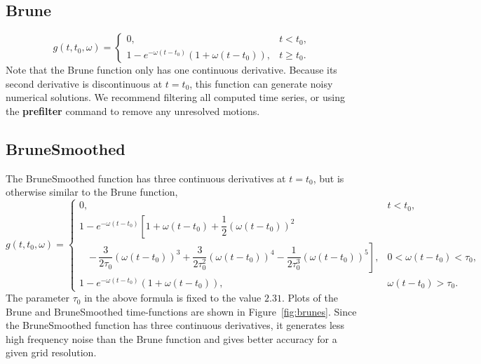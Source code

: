 \documentclass[11pt]{report}
\begin{document}
\subsection{Brune} 
 \label{brune}
\[
 g(t,t_0,\omega) = \left\{
\begin{array}{ll} 
0, & t < t_0, \\ 
1 - e^{-\omega(t-t_0)}( 1+\omega(t-t_0) ), & t \geq t_0.
\end{array}
\right.
\]
Note that the Brune function only has one continuous derivative. Because its second derivative is discontinuous at
$t=t_0$, this function can generate noisy numerical solutions. We recommend filtering all computed time
series, or using the {\bf prefilter} command to remove any unresolved motions.

\subsection{BruneSmoothed}
The BruneSmoothed function has three continuous derivatives at $t=t_0$, but is otherwise similar to
the Brune function,
\[
 g(t,t_0,\omega) = \left\{
\begin{array}{ll} 
0, & t < t_0, \\ 
1 - e^{-\omega(t-t_0)}\left[ 1+\omega(t-t_0) + \dfrac{1}{2}(\omega(t-t_0))^2\right. & \\
\quad \left.-\,\dfrac{3}{2\tau_0}( \omega(t-t_0))^3  + \dfrac{3}{2\tau_0^2}( \omega(t-t_0))^4 -
 \dfrac{1}{2\tau_0^3}( \omega(t-t_0))^5 \right], & 0< \omega (t-t_0) < \tau_0,\\
1 - e^{-\omega(t-t_0)}( 1+\omega(t-t_0) ), & \omega (t-t_0) > \tau_0.
\end{array}
\right.
\]
The parameter $\tau_0$ in the above formula is fixed to the value $2.31$. Plots of the Brune and
BruneSmoothed time-functions are shown in Figure~\ref{fig:brunes}. Since the BruneSmoothed function
has three continuous derivatives, it generates less high frequency noise than the Brune function and
gives better accuracy for a given grid resolution.
\end{document}
